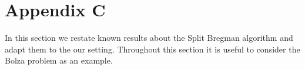 \documentclass[11pt]{article}
\theoremstyle{plain}
\begin{document}
%
 
 




\section{Appendix C}\label{s:appendixB}
In this section we restate known results about the Split Bregman algorithm and adapt them to the our setting. Throughout this section it is useful to consider the Bolza problem as an example.
\end{document}

